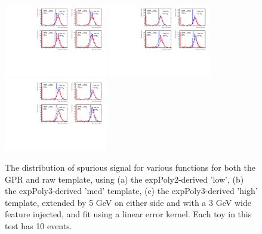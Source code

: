 \begin{figure} 
\begin{center}
  \includegraphics[width=0.4\textwidth]{figures/background/gpr/validation/linear/ToyTest_FitSigVals_lowpT_10_Sig}   
  \includegraphics[width=0.4\textwidth]{figures/background/gpr/validation/linear/ToyTest_FitSigVals_medpT_10_Sig}   
  \includegraphics[width=0.4\textwidth]{figures/background/gpr/validation/linear/ToyTest_FitSigVals_highpT_10_Sig}   
\caption{The distribution of spurious signal for various functions for both the GPR and raw template, using (a) the expPoly2-derived 'low', (b) the expPoly3-derived 'med' template, (c) the expPoly3-derived 'high' template, extended by 5 GeV on either side and with a 3 GeV wide feature injected, and fit using a linear error kernel. Each toy in this test has 10 events.}
\label{fig:linearkernel_lowpt_10_Sig}
\end{center}
\end{figure}

